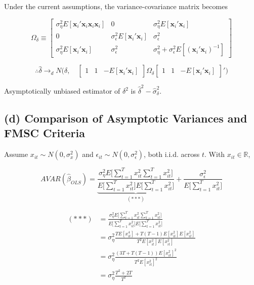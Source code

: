 Under the current assumptions, the variance-covariance matrix becomes

\[ \Omega_\delta \equiv
\begin{bmatrix}
\sigma_\eta^2 E[\mathbf{x}_i'\mathbf{x}_i \mathbf{x}_i \mathbf{x}_i] & 0 & \sigma_\eta^2 E[\mathbf{x}_i'\mathbf{x}_i]\\
 0 & \sigma_\epsilon^2 E[\mathbf{x}_i'\mathbf{x}_i] & \sigma_\epsilon^2\\
\sigma_\eta^2 E[\mathbf{x}_i'\mathbf{x}_i]& \sigma_\epsilon^2 & \sigma_\eta^2 + \sigma_\epsilon^2 E[(\mathbf{x}_i'\mathbf{x}_i)^{-1}]
\end{bmatrix}
\]


\[
\therefore \widehat{\delta} \rightarrow_d N\bigg( \delta, \quad \begin{bmatrix}
1 & 1& -E[\mathbf{x}_i'\mathbf{x}_i]
\end{bmatrix}  \Omega_\delta \begin{bmatrix}
1 & 1& -E[\mathbf{x}_i'\mathbf{x}_i]
\end{bmatrix}'  \bigg)
\]


Asymptotically unbiased estimator of $\delta^2$ is $\widehat{\delta}^2 - \widehat{\sigma}_\delta^2.$
\vspace{0.2in}

\subsection*{(d) Comparison of Asymptotic Variances and FMSC Criteria}
\vspace{0.2in}
Assume $x_{it} \sim N(0, \sigma_x^2)$ and $\epsilon_{it} \sim N(0, \sigma_\epsilon^2)$, both i.i.d. across $t$. With $x_{it} \in \mathbb{R}$,

\[
AVAR(\widehat{\beta}_{OLS}) = \underbrace{\frac{\sigma_\eta^2 E\big[\sum_{t=1}^T x_{it}^2 \sum_{t=1}^T x_{it}^2 \big ]}{E\big [\sum_{t=1}^T x_{it}^2 \big]E\big[\sum_{t=1}^T x_{it}^2 \big]}}_{(***)} +\frac{\sigma_\epsilon^2}{E\big[\sum_{t=1}^T x_{it}^2\big ]}
\]

\begin{align*}
(***) &= \frac{\sigma_\eta^2 E\big[\sum_{t=1}^T x_{it}^2 \sum_{t=1}^T x_{it}^2 \big ]}{E\big [\sum_{t=1}^T x_{it}^2 \big]E\big[\sum_{t=1}^T x_{it}^2 \big]}\\
& = \sigma_\eta^2 \frac{T E[x_{it}^4] + T(T-1) E[x_{it}^2] E[x_{it}^2]}{T^2 E[x_{it}^2] E[x_{it}^2]}\\
&= \sigma_\eta^2\frac{(3T + T(T-1)) E[x_{it}^2]^2}{T^2 E[x_{it}^2]^2}\\
&=\sigma_\eta^2 \frac{T^2+2T}{T^2}
\end{align*}


